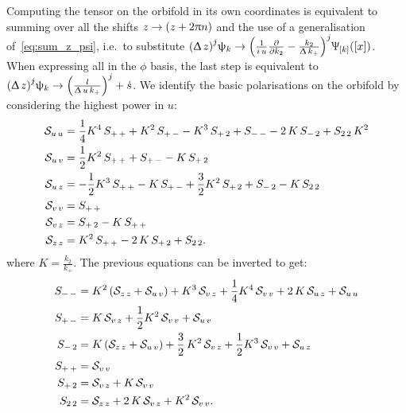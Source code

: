 Computing the tensor on the orbifold in its own coordinates is equivalent to summing over all the shifts $z \rightarrow \qty(z + 2 \uppi n)$ and the use of a generalisation of~\eqref{eq:sum_z_psi}, i.e.\, to substitute $\qty(\Updelta\, z)^j \uppsi_k \rightarrow \qty( \frac{1}{i\, u} \pdv{}{k_2} - \frac{k_2}{\Updelta\, k_+} )^j \Uppsi_{\qty[k]}\qty(\qty[x])$.
When expressing all in the $\phi$ basis, the last step is equivalent to $\qty(\Updelta\, z)^j \uppsi_k \rightarrow \qty(\frac{l}{\Updelta\, u\, k_+})^j + \dot{s}$.
We identify the basic polarisations on the orbifold by considering the highest power in $u$:
\begin{equation}
  \begin{split}
    \mathcal{S}_{u\,u}
    & =
    \frac{1}{4}  K^4\, S_{+\,+}
    +
    K^2\, S_{+\,-}
    -
    K^3\, S_{+\,2}
    +
    S_{-\,-}
    -
    2\, K\, S_{-\,2}
    +
    S_{2\,2}\, K^2
    \\
    \mathcal{S}_{u\,v}
    & =
    \frac{1}{2} K^2\, S_{+\,+}
    +
    S_{+\,-}
    -
    K\, S_{+\,2}
    \\
    \mathcal{S}_{u\,z}
    & =
    -\frac{1}{2} K^3\,S_{+\,+}
    -
    K\, S_{+\,-}
    +
    \frac{3}{2} K^2\, S_{+\,2}
    +
    S_{-\,2}
    -
    K\, S_{2\,2}
    \\
    \mathcal{S}_{v\,v}
    & =
    S_{+\,+}
    \\
    \mathcal{S}_{v\,z}
    & =
    S_{+\,2} - K\, S_{+\,+}
    \\
    \mathcal{S}_{z\,z}
    & =
    K^2\, S_{+\,+} - 2\, K\, S_{+\,2} + S_{2\,2}.
  \end{split}
\end{equation}
where $K = \frac{k_2}{k_+}$.
The previous equations can be inverted to get:
\begin{equation}
  \begin{split}
    S_{-\,-}
    & =
    K^2\, \qty(\mathcal{S}_{z\,z} + \mathcal{S}_{u\,v})
    +
    K^3\, \mathcal{S}_{v\,z}
    +
    \frac{1}{4} K^4\, \mathcal{S}_{v\,v}
    +
    2\,
    K\,
    \mathcal{S}_{u\,z}
    +
    \mathcal{S}_{u\,u}
    \\
    S_{+\,-}
    & =
    K\, \mathcal{S}_{v\,z}
    +
    \frac{1}{2} K^2\, \mathcal{S}_{v\,v}
    +
    \mathcal{S}_{u\,v}
    \\
    S_{-\,2}
    & =
    K\, \qty(\mathcal{S}_{z\,z} + \mathcal{S}_{u\,v})
    +
    \frac{3}{2}\, K^2\, \mathcal{S}_{v\,z}
    +
    \frac{1}{2} K^3\, \mathcal{S}_{v\,v}
    +
    \mathcal{S}_{u\,z}
    \\
    S_{+\,+}
    & =
    \mathcal{S}_{v\,v}
    \\
    S_{+\,2}
    & =
    \mathcal{S}_{v\,z}
    +
    K\, \mathcal{S}_{v\,v}
    \\
    S_{2\,2}
    & =
    \mathcal{S}_{z\,z}
    +
    2\, K\, \mathcal{S}_{v\,z}
    +
    K^2\, \mathcal{S}_{v\,v}.
  \end{split}
\end{equation}

